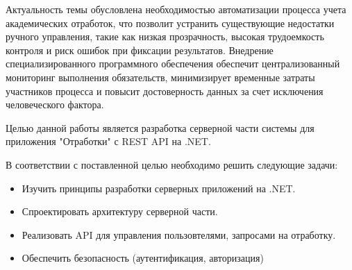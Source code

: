 \intro

Актуальность темы обусловлена необходимостью автоматизации процесса учета академических отработок, что позволит устранить существующие недостатки ручного управления, такие как низкая прозрачность, высокая трудоемкость контроля и риск ошибок при фиксации результатов. Внедрение специализированного программного обеспечения обеспечит централизованный мониторинг выполнения обязательств, минимизирует временные затраты участников процесса и повысит достоверность данных за счет исключения человеческого фактора.

Целью данной работы является разработка серверной части системы для приложения "Отработки" с REST API на .NET.

В соответствии с поставленной целью необходимо решить следующие задачи:
\begin{itemize}
	\item{Изучить принципы разработки серверных приложений на .NET.}
	\item{Спроектировать архитектуру серверной части.}
	\item{Реализовать API для управления пользовтелями, запросами на отработку.}
	\item{Обеспечить безопасность (аутентификация, авторизация)}
\end{itemize}
